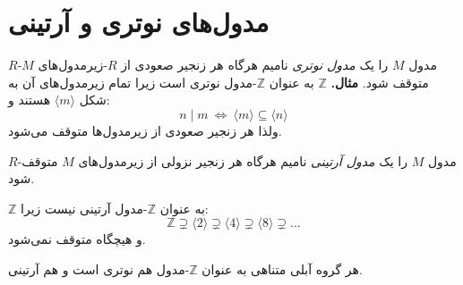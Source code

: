 \section{مدول‌های نوتری و آرتینی}

\begin{frame}

    \begin{definition}
        $R$-مدول $M$ را یک \textit{مدول نوتری} نامیم هرگاه هر زنجیر صعودی از $R$-زیرمدول‌های $M$ متوقف شود.
        \textbf{مثال.} $\mathbb{Z}$ به عنوان $\mathbb{Z}$-مدول نوتری است زیرا تمام زیرمدول‌های آن به شکل $\langle m \rangle$ هستند و:
        \[
            n \mid m \ \Leftrightarrow\ \langle m \rangle \subseteq \langle n \rangle
        \]
        ولذا هر زنجیر صعودی از زیرمدول‌ها متوقف می‌شود.
    \end{definition}

    \begin{definition}
        $R$-مدول $M$ را یک \textit{مدول آرتینی} نامیم هرگاه هر زنجیر نزولی از زیرمدول‌های $M$ متوقف شود.
    \end{definition}
\end{frame}


\begin{frame}

    \begin{example}
        $\mathbb{Z}$ به عنوان $\mathbb{Z}$-مدول آرتینی نیست زیرا:
        \[
            \mathbb{Z} \supsetneq \langle 2 \rangle \supsetneq \langle 4 \rangle \supsetneq \langle 8 \rangle \supsetneq \dots
        \]
        و هیچگاه متوقف نمی‌شود.

    \end{example}

    \begin{example}
        هر گروه آبلی متناهی به عنوان $\mathbb{Z}$-مدول هم نوتری است و هم آرتینی.
    \end{example}




\end{frame}

